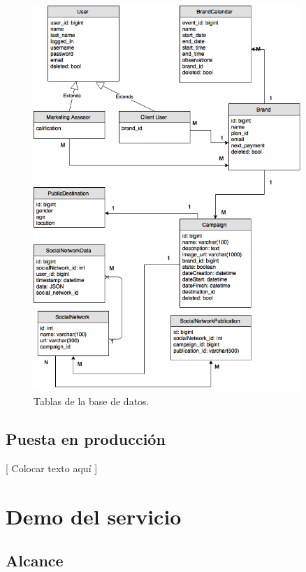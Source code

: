 \documentclass[oneside]{book}
\begin{document}
\begin{figure}[H]
	\centering
	\includegraphics[width=0.9\textwidth]{images/weepo-01.png}
	\medskip
	\caption{Tablas de la base de datos.}
	\medskip
\end{figure}	
	
\newpage


\section{Puesta en producción}

	[ Colocar texto aquí ]
\bigskip




%
%
\chapter{Demo del servicio}


\section{Alcance}
\end{document}
